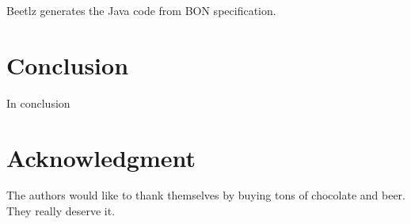 \documentclass[conference]{IEEEtran}
\begin{document}
Beetlz generates the Java code from BON specification.

\section{Conclusion}
\label{sec:conclusion}

In conclusion


\section*{Acknowledgment}
\label{sec:acknowledgment}

The authors would like to thank themselves by buying tons of chocolate
and beer. They really deserve it. 



%
%
%
%





\end{document}
